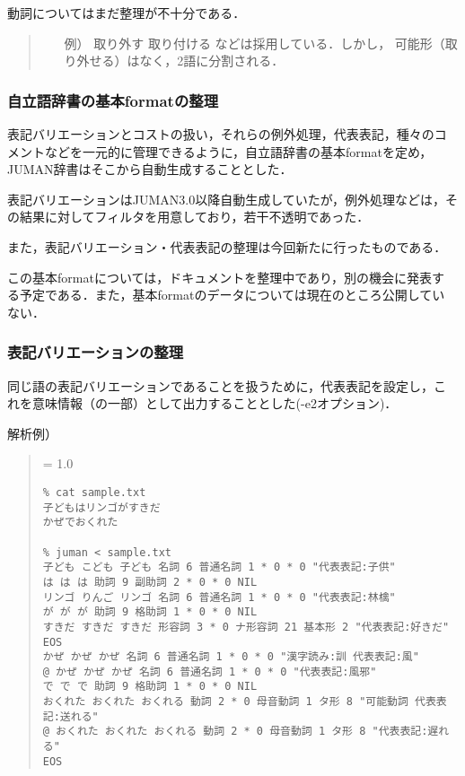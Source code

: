 \documentclass[a4j,titlepage]{jarticle}
\begin{document}
動詞についてはまだ整理が不十分である．
       \begin{quote}
	\begin{itemize}
	 \item[例）] 取り外す 取り付ける などは採用している．しかし，
		   可能形（取り外せる）はなく，2語に分割される．
	\end{itemize}
       \end{quote}


\subsubsection{自立語辞書の基本formatの整理}

表記バリエーションとコストの扱い，それらの例外処理，代表表記，種々のコ
メントなどを一元的に管理できるように，自立語辞書の基本formatを定め，
JUMAN辞書はそこから自動生成することとした．

表記バリエーションはJUMAN3.0以降自動生成していたが，例外処理などは，そ
の結果に対してフィルタを用意しており，若干不透明であった．

また，表記バリエーション・代表表記の整理は今回新たに行ったものである．

この基本formatについては，ドキュメントを整理中であり，別の機会に発表す
る予定である．また，基本formatのデータについては現在のところ公開してい
ない．


\subsubsection{表記バリエーションの整理}

同じ語の表記バリエーションであることを扱うために，代表表記を設定し，こ
れを意味情報（の一部）として出力することとした(-e2オプション)．

解析例）
\begin{quote}
{\baselineskip = 1.0 \baselineskip
\begin{verbatim}
% cat sample.txt
子どもはリンゴがすきだ
かぜでおくれた

% juman < sample.txt
子ども こども 子ども 名詞 6 普通名詞 1 * 0 * 0 "代表表記:子供"
は は は 助詞 9 副助詞 2 * 0 * 0 NIL
リンゴ りんご リンゴ 名詞 6 普通名詞 1 * 0 * 0 "代表表記:林檎"
が が が 助詞 9 格助詞 1 * 0 * 0 NIL
すきだ すきだ すきだ 形容詞 3 * 0 ナ形容詞 21 基本形 2 "代表表記:好きだ"
EOS
かぜ かぜ かぜ 名詞 6 普通名詞 1 * 0 * 0 "漢字読み:訓 代表表記:風"
@ かぜ かぜ かぜ 名詞 6 普通名詞 1 * 0 * 0 "代表表記:風邪"
で で で 助詞 9 格助詞 1 * 0 * 0 NIL
おくれた おくれた おくれる 動詞 2 * 0 母音動詞 1 タ形 8 "可能動詞 代表表記:送れる"
@ おくれた おくれた おくれる 動詞 2 * 0 母音動詞 1 タ形 8 "代表表記:遅れる"
EOS
\end{verbatim}
}
\end{quote}
\end{document}
